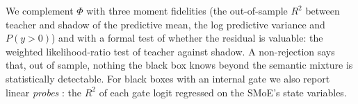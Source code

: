 \noindent We complement $\Phi$ with three moment fidelities (the out-of-sample $R^2$ between teacher
and shadow of the predictive mean, the log predictive variance and $P(y>0)$) and with a formal test
of whether the residual is valuable: the \citet{amisano2007comparing} weighted likelihood-ratio test of
teacher against shadow. A non-rejection says that, out of sample, nothing the black box knows beyond
the semantic mixture is statistically detectable. For black boxes with an internal gate we also
report linear \emph{probes} \citep{alain2016understanding}: the $R^2$ of each gate logit regressed on
the SMoE's state variables.
